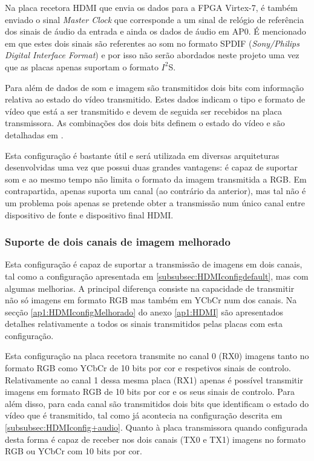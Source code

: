 Na placa recetora HDMI que envia os dados para a FPGA Virtex-7, é também enviado o sinal \textit{Master Clock} que corresponde a um sinal de relógio de referência dos sinais de áudio da entrada e ainda os dados de áudio em AP0. É mencionado em \cite{R016} que estes dois sinais são referentes ao som no formato SPDIF (\textit{Sony/Philips Digital Interface Format}) e por isso não serão abordados neste projeto uma vez que as placas apenas suportam o formato $I^{2}$S.

Para além de dados de som e imagem são transmitidos dois bits com informação relativa ao estado do vídeo transmitido. Estes dados indicam o tipo e formato de vídeo que está a ser transmitido e devem de seguida ser recebidos na placa transmissora. As combinações dos dois bits definem o estado do vídeo e são detalhadas em \cite{R014}.

Esta configuração é bastante útil e será utilizada em diversas arquiteturas desenvolvidas uma vez que possui duas grandes vantagens: é capaz de suportar som e ao mesmo tempo não limita o formato da imagem transmitida a RGB. Em contrapartida, apenas suporta um canal (ao contrário da anterior), mas tal não é um problema pois apenas se pretende obter a transmissão num único canal entre dispositivo de fonte e dispositivo final HDMI. 


\subsubsection{Suporte de dois canais de imagem melhorado} \label{subsubsec:HDMIconfigMelhorado}


Esta configuração é capaz de suportar a transmissão de imagens em dois canais, tal como a configuração apresentada em \ref{subsubsec:HDMIconfigdefault}, mas com algumas melhorias. A principal diferença consiste na capacidade de transmitir não só imagens em formato RGB mas também em YCbCr num dos canais. Na secção \ref{ap1:HDMIconfigMelhorado} do anexo \ref{ap1:HDMI} são apresentados detalhes relativamente a todos os sinais transmitidos pelas placas com esta configuração.

Esta configuração na placa recetora transmite no canal 0 (RX0) imagens tanto no formato RGB como YCbCr de 10 bits por cor e respetivos sinais de controlo. Relativamente ao canal 1 dessa mesma placa (RX1) apenas é possível transmitir imagens em formato RGB de 10 bits por cor e os seus sinais de controlo. Para além disso, para cada canal são transmitidos dois bits que identificam o estado do vídeo que é transmitido, tal como já acontecia na configuração descrita em \ref{subsubsec:HDMIconfig+audio}. Quanto à placa transmissora quando configurada desta forma é capaz de receber nos dois canais (TX0 e TX1) imagens no formato RGB ou YCbCr com 10 bits por cor. 


